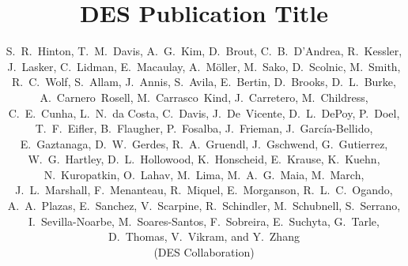 \documentclass[iop]{emulateapj}
\begin{document}
\title{DES Publication Title}
 

\def\andname{}

\author{
S.~R.~Hinton,
T.~M.~Davis,
A.~G.~Kim,
D.~Brout,
C.~B.~D'Andrea,
R.~Kessler,
J.~Lasker,
C.~Lidman,
E.~Macaulay,
A.~M\"oller,
M.~Sako,
D.~Scolnic,
M.~Smith,
R.~C.~Wolf,
S.~Allam,
J.~Annis,
S.~Avila,
E.~Bertin,
D.~Brooks,
D.~L.~Burke,
A.~Carnero~Rosell,
M.~Carrasco~Kind,
J.~Carretero,
M.~Childress,
C.~E.~Cunha,
L.~N.~da Costa,
C.~Davis,
J.~De~Vicente,
D.~L.~DePoy,
P.~Doel,
T.~F.~Eifler,
B.~Flaugher,
P.~Fosalba,
J.~Frieman,
J.~Garc\'ia-Bellido,
E.~Gaztanaga,
D.~W.~Gerdes,
R.~A.~Gruendl,
J.~Gschwend,
G.~Gutierrez,
W.~G.~Hartley,
D.~L.~Hollowood,
K.~Honscheid,
E.~Krause,
K.~Kuehn,
N.~Kuropatkin,
O.~Lahav,
M.~Lima,
M.~A.~G.~Maia,
M.~March,
J.~L.~Marshall,
F.~Menanteau,
R.~Miquel,
E.~Morganson,
R.~L.~C.~Ogando,
A.~A.~Plazas,
E.~Sanchez,
V.~Scarpine,
R.~Schindler,
M.~Schubnell,
S.~Serrano,
I.~Sevilla-Noarbe,
M.~Soares-Santos,
F.~Sobreira,
E.~Suchyta,
G.~Tarle,
D.~Thomas,
V.~Vikram,
and Y.~Zhang
\\ \vspace{0.2cm} (DES Collaboration) \\
}
\end{document}
